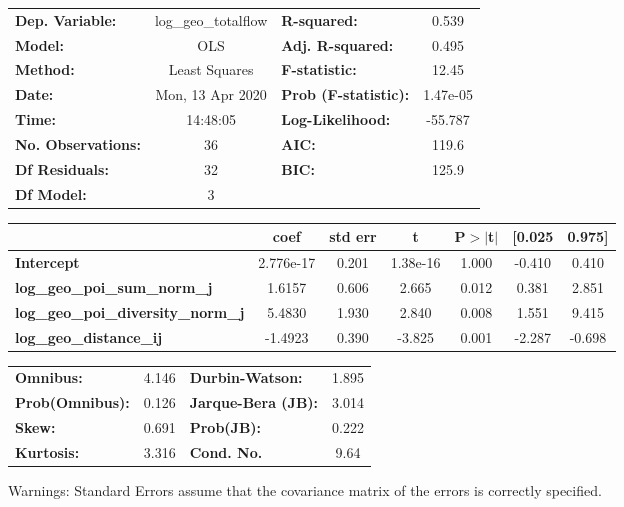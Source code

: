 \begin{center}
\begin{tabular}{lclc}
\toprule
\textbf{Dep. Variable:}                    & log\_geo\_totalflow & \textbf{  R-squared:         } &     0.539   \\
\textbf{Model:}                            &         OLS         & \textbf{  Adj. R-squared:    } &     0.495   \\
\textbf{Method:}                           &    Least Squares    & \textbf{  F-statistic:       } &     12.45   \\
\textbf{Date:}                             &   Mon, 13 Apr 2020  & \textbf{  Prob (F-statistic):} &  1.47e-05   \\
\textbf{Time:}                             &       14:48:05      & \textbf{  Log-Likelihood:    } &   -55.787   \\
\textbf{No. Observations:}                 &            36       & \textbf{  AIC:               } &     119.6   \\
\textbf{Df Residuals:}                     &            32       & \textbf{  BIC:               } &     125.9   \\
\textbf{Df Model:}                         &             3       & \textbf{                     } &             \\
\bottomrule
\end{tabular}
\begin{tabular}{lcccccc}
                                           & \textbf{coef} & \textbf{std err} & \textbf{t} & \textbf{P$> |$t$|$} & \textbf{[0.025} & \textbf{0.975]}  \\
\midrule
\textbf{Intercept}                         &    2.776e-17  &        0.201     &  1.38e-16  &         1.000        &       -0.410    &        0.410     \\
\textbf{log\_geo\_poi\_sum\_norm\_j}       &       1.6157  &        0.606     &     2.665  &         0.012        &        0.381    &        2.851     \\
\textbf{log\_geo\_poi\_diversity\_norm\_j} &       5.4830  &        1.930     &     2.840  &         0.008        &        1.551    &        9.415     \\
\textbf{log\_geo\_distance\_ij}            &      -1.4923  &        0.390     &    -3.825  &         0.001        &       -2.287    &       -0.698     \\
\bottomrule
\end{tabular}
\begin{tabular}{lclc}
\textbf{Omnibus:}       &  4.146 & \textbf{  Durbin-Watson:     } &    1.895  \\
\textbf{Prob(Omnibus):} &  0.126 & \textbf{  Jarque-Bera (JB):  } &    3.014  \\
\textbf{Skew:}          &  0.691 & \textbf{  Prob(JB):          } &    0.222  \\
\textbf{Kurtosis:}      &  3.316 & \textbf{  Cond. No.          } &     9.64  \\
\bottomrule
\end{tabular}
\end{center}

Warnings: \newline
 [1] Standard Errors assume that the covariance matrix of the errors is correctly specified.